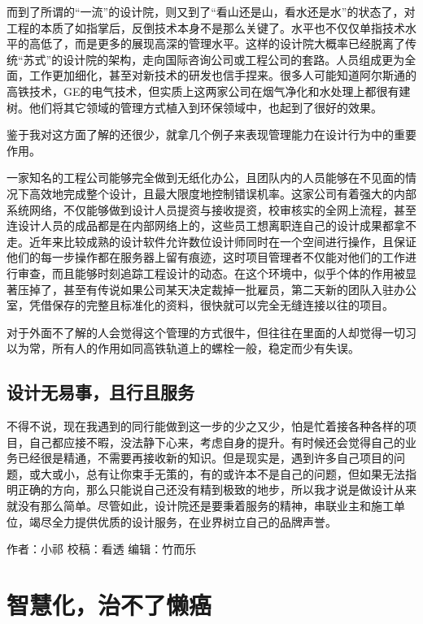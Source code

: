 \documentclass[]{book}
\begin{document}
而到了所谓的``一流''的设计院，则又到了``看山还是山，看水还是水''的状态了，对工程的本质了如指掌后，反倒技术本身不是那么关键了。水平也不仅仅单指技术水平的高低了，而是更多的展现高深的管理水平。这样的设计院大概率已经脱离了传统``苏式''的设计院的架构，走向国际咨询公司或工程公司的套路。人员组成更为全面，工作更加细化，甚至对新技术的研发也信手捏来。很多人可能知道阿尔斯通的高铁技术，GE的电气技术，但实质上这两家公司在烟气净化和水处理上都很有建树。他们将其它领域的管理方式植入到环保领域中，也起到了很好的效果。

鉴于我对这方面了解的还很少，就拿几个例子来表现管理能力在设计行为中的重要作用。

一家知名的工程公司能够完全做到无纸化办公，且团队内的人员能够在不见面的情况下高效地完成整个设计，且最大限度地控制错误机率。这家公司有着强大的内部系统网络，不仅能够做到设计人员提资与接收提资，校审核实的全网上流程，甚至连设计人员的成品都是在内部网络上的，这些员工想离职连自己的设计成果都拿不走。近年来比较成熟的设计软件允许数位设计师同时在一个空间进行操作，且保证他们的每一步操作都在服务器上留有痕迹，这时项目管理者不仅能对他们的工作进行审查，而且能够时刻追踪工程设计的动态。在这个环境中，似乎个体的作用被显著压掉了，甚至有传说如果公司某天决定裁掉一批雇员，第二天新的团队入驻办公室，凭借保存的完整且标准化的资料，很快就可以完全无缝连接以往的项目。

对于外面不了解的人会觉得这个管理的方式很牛，但往往在里面的人却觉得一切习以为常，所有人的作用如同高铁轨道上的螺栓一般，稳定而少有失误。

\hypertarget{ux8bbeux8ba1ux65e0ux6613ux4e8bux4e14ux884cux4e14ux670dux52a1}{%
\subsection{设计无易事，且行且服务}\label{ux8bbeux8ba1ux65e0ux6613ux4e8bux4e14ux884cux4e14ux670dux52a1}}

不得不说，现在我遇到的同行能做到这一步的少之又少，怕是忙着接各种各样的项目，自己都应接不暇，没法静下心来，考虑自身的提升。有时候还会觉得自己的业务已经很是精通，不需要再接收新的知识。但是现实是，遇到许多自己项目的问题，或大或小，总有让你束手无策的，有的或许本不是自己的问题，但如果无法指明正确的方向，那么只能说自己还没有精到极致的地步，所以我才说是做设计从来就没有那么简单。尽管如此，设计院还是要秉着服务的精神，串联业主和施工单位，竭尽全力提供优质的设计服务，在业界树立自己的品牌声誉。

作者：小祁
校稿：看透
编辑：竹而乐

\hypertarget{ux667aux6167ux5316ux6cbbux4e0dux4e86ux61d2ux764c}{%
\section{智慧化，治不了懒癌}\label{ux667aux6167ux5316ux6cbbux4e0dux4e86ux61d2ux764c}}
\end{document}
